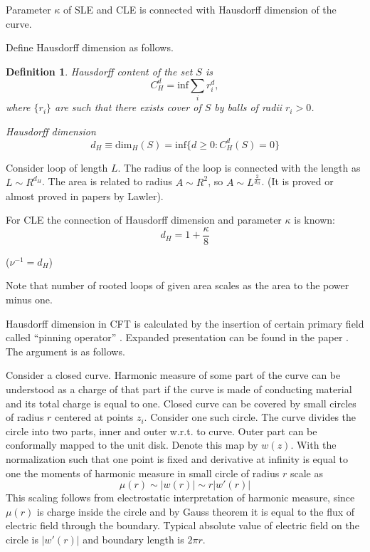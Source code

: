 \documentclass[12pt]{article}
\newtheorem{definition}{Definition}
\begin{document}
Parameter $\kappa$ of SLE and CLE is connected with Hausdorff dimension of the curve. 


Define Hausdorff dimension as follows.
\begin{definition}
  {\it Hausdorff content} of the set $S$ is
  \begin{equation}
    \label{eq:3}
    C^d_H = \mathrm{inf} \sum_i r_i^d,
  \end{equation}
  where $\{r_i\}$ are such that there exists cover of $S$ by balls of
  radii $r_i>0$. 

  {\it Hausdorff dimension}
  \begin{equation}
    \label{eq:4}
    d_H\equiv\mathrm{dim}_H(S) = \mathrm{inf}\{ d\geq 0: C^d_H(S)=0\}
  \end{equation}
\end{definition}


Consider loop of length $L$. The radius of the loop is connected with
the length as $L\sim R^{d_H}$. The area is related to radius $A\sim
R^2$, so $A\sim L^{\frac{2}{d_H}}$.
(It is proved or almost proved in papers by Lawler).

For CLE the connection of Hausdorff dimension and parameter $\kappa$
is known:
\begin{equation}
  \label{eq:5}
  d_H=1+\frac{\kappa}{8}
\end{equation}

($\nu^{-1}=d_H$)

Note that number of rooted loops of given area scales as the area to
the power minus one. 

Hausdorff dimension in CFT is calculated by the insertion of certain primary field called ``pinning
operator'' \cite{bettelheim2005harmonic}. Expanded presentation can be found in the paper
\cite{gruzberg2006stochastic}. The argument is as follows. 

Consider a closed curve. Harmonic measure of some part of the curve can be understood as a charge of
that part if the curve is made of conducting material and its total charge is equal to one. 
Closed curve can be covered by small circles of radius $r$ centered at points
$z_{i}$. Consider one such circle. The curve divides the circle into two parts, inner and outer
w.r.t. to curve. Outer part can be conformally mapped to the unit disk. Denote this map by $w(z)$.
With the normalization such that one point is fixed and derivative at infinity is equal to one the
moments of harmonic measure in small circle of radius $r$ scale as
\begin{equation}
  \label{eq:116}
  \mu(r)\sim |w(r)|\sim r |w'(r)|
\end{equation}
This scaling follows from electrostatic interpretation of harmonic measure, since $\mu(r)$ is charge
inside the circle and by Gauss theorem it is equal to the flux of electric field through the
boundary. Typical absolute value of electric field on the circle is $|w'(r)|$ and boundary length is
$2\pi r$.
\end{document}
